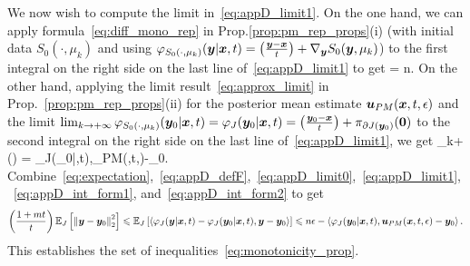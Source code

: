 We now wish to compute the limit in~\eqref{eq:appD_limit1}. On the one hand, we can apply formula~\eqref{eq:diff_mono_rep} in Prop.\ref{prop:pm_rep_props}(i) (with initial data $S_0(\cdot,\mu_k)$ and using $\varphi_{S_0(\cdot,\mu_k)}(\boldsymbol{y}|\boldsymbol{x},t) = \left(\frac{\boldsymbol{y}-\boldsymbol{x}}{t}\right) + \nabla_{\boldsymbol{y}}S_0(\boldsymbol{y},\mu_k)$) to the first integral on the right side on the last line of~\eqref{eq:appD_limit1} to get
\beq\label{eq:appD_int_form1}
 = n\epsilon.
\eeq
On the other hand, applying the limit result~\eqref{eq:approx_limit} in Prop.~\ref{prop:pm_rep_props}(ii) for the posterior mean estimate $\boldsymbol{u}_{PM}(\boldsymbol{x},t,\epsilon)$ and the limit $\lim_{k\to +\infty} \varphi_{S_0(\cdot,\mu_k)}(\boldsymbol{y}_0|\boldsymbol{x},t) = \varphi_{J}(\boldsymbol{y}_0|\boldsymbol{x},t) = \left(\frac{\boldsymbol{y}_0-\boldsymbol{x}}{t}\right) + \pi_{\partial J(\boldsymbol{y}_0)}(\boldsymbol{0})$ to the second integral on the right side on the last line of~\eqref{eq:appD_limit1}, we get
\beq\label{eq:appD_int_form2}
\liminf_{k\to +\infty} \left(\right) = \left\langle \varphi_{J}(\by_0|\bx,t),\bu_{PM}(\bx,t,\epsilon)-\by_0\right\rangle.
\eeq
Combine~\eqref{eq:expectation},~\eqref{eq:appD_defF},~\eqref{eq:appD_limit0},~\eqref{eq:appD_limit1},~\eqref{eq:appD_int_form1}, and~\eqref{eq:appD_int_form2} to get
\[
\left(\frac{1+mt}{t}\right)\mathbb{E}_{J}\left [{\left\Vert{\boldsymbol{y}-\boldsymbol{y}_0} \right\Vert_{2}^{2}}\right]\leqslant\mathbb{E}_{J}\left [{\left\langle \varphi_J(\boldsymbol{y}|\boldsymbol{x},t)-\varphi_J(\boldsymbol{y}_0|\boldsymbol{x},t),\boldsymbol{y}-\boldsymbol{y}_{0}\right\rangle}\right] \leqslant n\epsilon - \left\langle \varphi_{J}(\boldsymbol{y}_0|\boldsymbol{x},t),\boldsymbol{u}_{PM}(\boldsymbol{x},t,\epsilon)-\boldsymbol{y}_0\right\rangle.
\]
This establishes the set of inequalities~\eqref{eq:monotonicity_prop}.


